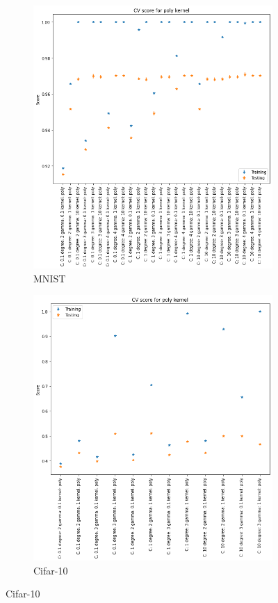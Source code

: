 \documentclass[a4paper]{article}
\begin{document}
\begin{figure}[H]
    \centering

    \begin{subfigure}[t]{0.45\linewidth}
    \includegraphics[width=\linewidth]{figures/mnist/cv_results_poly.png}
    \caption{MNIST}
    \end{subfigure}
    \begin{subfigure}[t]{0.45\linewidth}
    \includegraphics[width=\linewidth]{figures/cifar/cv_results_poly.png}
    \caption{Cifar-10}
    \end{subfigure}


\end{figure}
\end{document}
